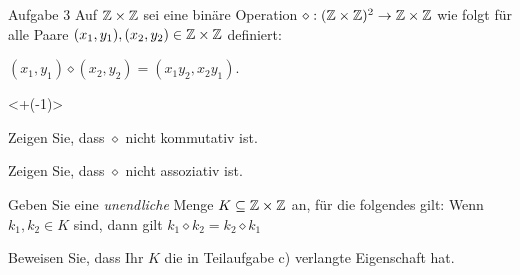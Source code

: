 \begin{frame}{Aufgabe 3}
    Auf $\mathbb{Z} \times \mathbb{Z}$ sei eine binäre Operation $\diamond: (\mathbb{Z} \times \mathbb{Z})^2 \to \mathbb{Z} \times \mathbb{Z}$ wie folgt für alle Paare $(x_1, y_1),(x_2, y_2) \in \mathbb{Z} \times \mathbb{Z}$ definiert:
    \begin{center}
        $(x_1, y_1) \diamond (x_2, y_2) = (x_1 y_2, x_2y_1)$.
    \end{center}
    \visible<+(-1)>{}

    \begin{alist}
        \item Zeigen Sie, dass $\diamond$ nicht kommutativ ist. \\
        \item Zeigen Sie, dass $\diamond$ nicht assoziativ ist. \\
        \item Geben Sie eine \textit{unendliche} Menge $K \subseteq \mathbb{Z} \times \mathbb{Z}$ an, für die folgendes gilt: Wenn $k_1, k_2 \in K$ sind, dann gilt $k_1 \diamond k_2 = k_2 \diamond k_1$ \\
        \item Beweisen Sie, dass Ihr $K$ die in Teilaufgabe c) verlangte Eigenschaft hat.\\
    \end{alist}
\end{frame}